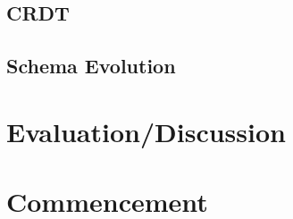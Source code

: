 \documentclass[english,submission]{programming}
\theoremstyle{definition}
\begin{document}
\subsection{CRDT}\label{CRDT}

\subsection{Schema Evolution}\label{schema}



\section{Evaluation/Discussion}




\section{Commencement}




\printbibliography
\end{document}
